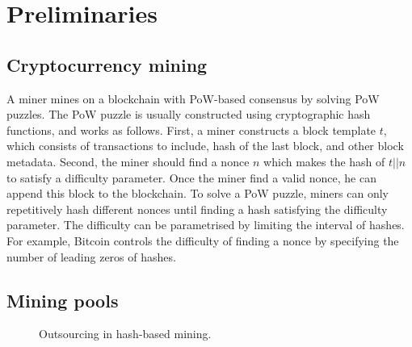 \section{Preliminaries}
\label{sec:preliminaries}

\subsection{Cryptocurrency mining}


A miner mines on a blockchain with PoW-based consensus by solving PoW puzzles.
The PoW puzzle is usually constructed using cryptographic hash functions, and works as follows.
First, a miner constructs a block template $t$, which consists of transactions to include, hash of the last block, and other block metadata.
Second, the miner should find a nonce $n$ which makes the hash of $t || n$ to satisfy a difficulty parameter.
Once the miner find a valid nonce, he can append this block to the blockchain.
To solve a PoW puzzle, miners can only repetitively hash different nonces until finding a hash satisfying the difficulty parameter.
The difficulty can be parametrised by limiting the interval of hashes.
For example, Bitcoin controls the difficulty of finding a nonce by specifying the number of leading zeros of hashes.





\subsection{Mining pools}

\begin{figure}[]
    \centering
    \begin{msc}{}
        \setlength{\envinstdist}{2.5cm}

        \setlength{\instdist}{3.5cm}
        \setlength{\instwidth}{1.5cm}
        


        \nextlevel[4]

        \nextlevel

        \nextlevel[3]

        \nextlevel

        \nextlevel[2]
    \end{msc}
    \caption{Outsourcing in hash-based mining.}
    \label{fig:outsource-original}
\end{figure}


